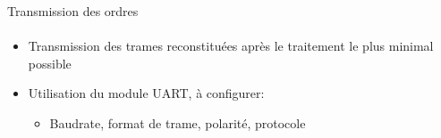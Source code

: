 \begin{frame}
  \tableofcontents[currentsection]
\end{frame}

\begin{frame}{Transmission des ordres}
\framesubtitle{}
\begin{itemize}
  \item Transmission des trames reconstituées après le traitement le plus minimal possible
  \item Utilisation du module UART, à configurer:
  \begin{itemize}
    \item Baudrate, format de trame, polarité, protocole
  \end{itemize}

\end{itemize}
\end{frame}

